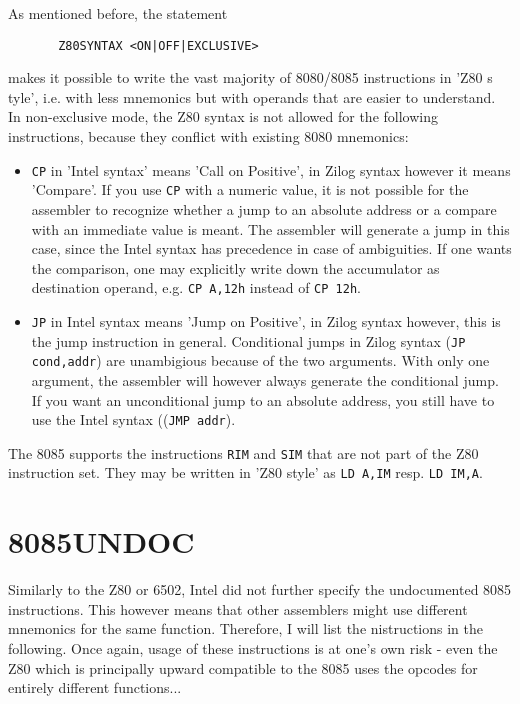 \documentclass[12pt,twoside]{report}
\newcommand{\tty}[1]{{\tt #1}}
\begin{document}
As mentioned before, the statement
\begin{verbatim}
       Z80SYNTAX <ON|OFF|EXCLUSIVE>
\end{verbatim}
makes it possible to write the vast majority of 8080/8085
instructions in 'Z80 s		tyle', i.e. with less mnemonics but with
operands that are easier to understand.  In non-exclusive mode,
the Z80 syntax is not allowed for the following instructions,
because they conflict with existing 8080 mnemonics:
\begin{itemize}
\item{\tty{CP} in 'Intel syntax' means 'Call on Positive', in
      Zilog syntax however it means 'Compare'.  If you use
      \tty{CP} with a numeric value, it is not possible for the
      assembler to recognize whether a jump to an absolute
      address or a compare with an immediate value is meant.
      The assembler will generate a jump in this case, since the
      Intel syntax has precedence in case of ambiguities. If
      one wants the comparison, one may explicitly write down the
      accumulator as destination operand, e.g. \tty{CP A,12h}
      instead of \tty{CP 12h}.}
\item{\tty{JP} in Intel syntax means 'Jump on Positive', in Zilog
      syntax however, this is the jump instruction in general.
      Conditional jumps in Zilog syntax (\tty{JP cond,addr}) are
      unambigious because of the two arguments.  With only one
      argument, the assembler will however always generate the
      conditional jump.  If you want an unconditional jump to
      an absolute address, you still have to use the Intel syntax
      ((\tty{JMP addr}).}
\end{itemize}
The 8085 supports the instructions \tty{RIM} and \tty{SIM} that are
not part of the Z80 instruction set.  They may be written in 'Z80 style'
as \tty{LD A,IM} resp. \tty{LD IM,A}.


\section{8085UNDOC}
\label{8085Spec}

Similarly to the Z80 or 6502, Intel did not further specify the
undocumented 8085 instructions.  This however means that other assemblers
might use different mnemonics for the same function.  Therefore, I will
list the nistructions in the following.  Once again, usage of these
instructions is at one's own risk - even the Z80 which is principally
upward compatible to the 8085 uses the opcodes for entirely different
functions...
\end{document}
